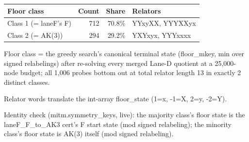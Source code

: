 \begin{tabular}{lrrl}
\toprule
Floor class & Count & Share & Relators \\
\midrule
Class 1 (= laneF's F) & 712 & 70.8\% & YYxyXX, YYYXXyx \\
Class 2 (= AK(3)) & 294 & 29.2\% & YXYxyx, YYYxxxx \\
\bottomrule
\end{tabular}

\vspace{2pt}
{\footnotesize
Floor class = the greedy search's canonical terminal state (floor\_mkey, min over signed relabelings) after re-solving every merged Lane-D quotient at a 25,000-node budget; all 1,006 probes bottom out at total relator length 13 in exactly 2 distinct classes.\par
Relator words translate the int-array floor\_state (1=x, -1=X, 2=y, -2=Y).\par
Identity check (mitm.symmetry\_keys, live): the majority class's floor state is the laneF\_F\_to\_AK3 cert's F start state (mod signed relabeling); the minority class's floor state is AK(3) itself (mod signed relabeling).\par
}
